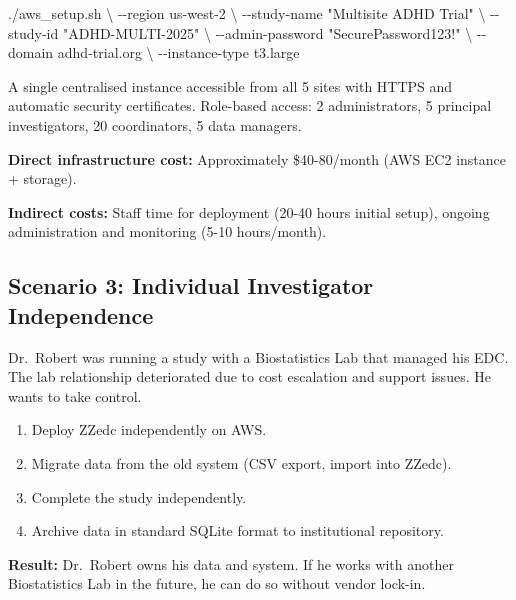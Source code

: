 \documentclass[
  letterpaper,
  DIV=11,
  numbers=noendperiod]{scrartcl}
\newenvironment{Shaded}{\begin{snugshade}}{\end{snugshade}}
\newcommand{\AttributeTok}[1]{\textcolor[rgb]{0.40,0.45,0.13}{#1}}
\newcommand{\DataTypeTok}[1]{\textcolor[rgb]{0.68,0.00,0.00}{#1}}
\newcommand{\ExtensionTok}[1]{\textcolor[rgb]{0.00,0.23,0.31}{#1}}
\newcommand{\NormalTok}[1]{\textcolor[rgb]{0.00,0.23,0.31}{#1}}
\newcommand{\StringTok}[1]{\textcolor[rgb]{0.13,0.47,0.30}{#1}}
\providecommand{\tightlist}{%
  \setlength{\itemsep}{0pt}\setlength{\parskip}{0pt}}
\begin{document}
\begin{Shaded}
\begin{Highlighting}[]
\ExtensionTok{./aws\_setup.sh} \DataTypeTok{\textbackslash{}}
  \AttributeTok{{-}{-}region}\NormalTok{ us{-}west{-}2 }\DataTypeTok{\textbackslash{}}
  \AttributeTok{{-}{-}study{-}name} \StringTok{"Multisite ADHD Trial"} \DataTypeTok{\textbackslash{}}
  \AttributeTok{{-}{-}study{-}id} \StringTok{"ADHD{-}MULTI{-}2025"} \DataTypeTok{\textbackslash{}}
  \AttributeTok{{-}{-}admin{-}password} \StringTok{"SecurePassword123!"} \DataTypeTok{\textbackslash{}}
  \AttributeTok{{-}{-}domain}\NormalTok{ adhd{-}trial.org }\DataTypeTok{\textbackslash{}}
  \AttributeTok{{-}{-}instance{-}type}\NormalTok{ t3.large}
\end{Highlighting}
\end{Shaded}

A single centralised instance accessible from all 5 sites with HTTPS and
automatic security certificates. Role-based access: 2 administrators, 5
principal investigators, 20 coordinators, 5 data managers.

\textbf{Direct infrastructure cost:} Approximately \$40-80/month (AWS
EC2 instance + storage).

\textbf{Indirect costs:} Staff time for deployment (20-40 hours initial
setup), ongoing administration and monitoring (5-10 hours/month).

\subsection{Scenario 3: Individual Investigator
Independence}\label{scenario-3-individual-investigator-independence}

Dr.~Robert was running a study with a Biostatistics Lab that managed his
EDC. The lab relationship deteriorated due to cost escalation and
support issues. He wants to take control.

\begin{enumerate}
\def\labelenumi{\arabic{enumi}.}
\tightlist
\item
  Deploy ZZedc independently on AWS.
\item
  Migrate data from the old system (CSV export, import into ZZedc).
\item
  Complete the study independently.
\item
  Archive data in standard SQLite format to institutional repository.
\end{enumerate}

\textbf{Result:} Dr.~Robert owns his data and system. If he works with
another Biostatistics Lab in the future, he can do so without vendor
lock-in.
\end{document}
